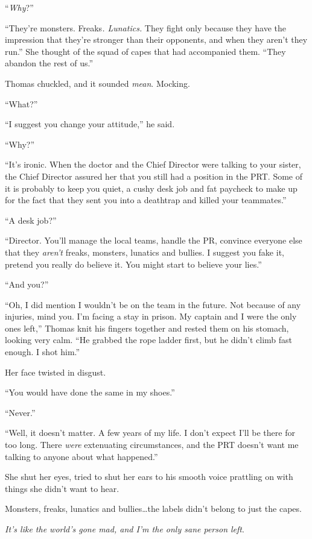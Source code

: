 ``\emph{Why}?''



``They're monsters.  Freaks\emph{.  Lunatics. } They fight only because they have the impression that they're stronger than their opponents, and when they aren't they run.''  She thought of the squad of capes that had accompanied them. ``They abandon the rest of us.''



Thomas chuckled, and it sounded \emph{mean}.  Mocking.



``What?''



``I suggest you change your attitude,'' he said.



``Why?''



``It's ironic.  When the doctor and the Chief Director were talking to your sister, the Chief Director assured her that you still had a position in the PRT.  Some of it is probably to keep you quiet, a cushy desk job and fat paycheck to make up for the fact that they sent you into a deathtrap and killed your teammates.''



``A desk job?''



``Director.  You'll manage the local teams, handle the PR, convince everyone else that they \emph{aren't} freaks, monsters, lunatics and bullies.  I suggest you fake it, pretend you really do believe it.  You might start to believe your lies.''



``And you?''



``Oh, I did mention I wouldn't be on the team in the future.  Not because of any injuries, mind you.  I'm facing a stay in prison.  My captain and I were the only ones left,'' Thomas knit his fingers together and rested them on his stomach, looking very calm.  ``He grabbed the rope ladder first, but he didn't climb fast enough.  I shot him.''



Her face twisted in disgust.



``You would have done the same in my shoes.''



``Never.''



``Well, it doesn't matter.  A few years of my life.  I don't expect I'll be there for too long.  There \emph{were} extenuating circumstances, and the PRT doesn't want me talking to anyone about what happened.''



She shut her eyes, tried to shut her ears to his smooth voice prattling on with things she didn't want to hear.



Monsters, freaks, lunatics and bullies\ldots the labels didn't belong to just the capes.



\emph{It's like the world's gone mad, and I'm the only sane person left}.





